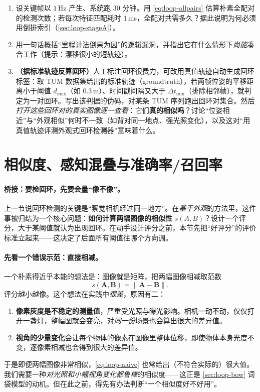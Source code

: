\begin{practice}
\begin{enumerate}
  \item 设关键帧以 $1$\,Hz 产生、系统跑 $30$ 分钟。用 \cref{eq:loop-allpairs} 估算朴素全配对的检测次数；若每次特征匹配耗时 $1$\,ms，全配对共需多久？据此说明为何必须用倒排索引（\cref{sec:loop-stageA}）。
  \item 用一句话概括“里程计法倒果为因”的逻辑漏洞，并指出它在什么情形下\emph{尚能}凑合工作（提示：漂移很小的短轨迹）。
  \item \textbf{（据标准轨迹反算回环）}人工标注回环很费力，可改用真值轨迹自动生成回环标签：取 TUM 数据集给出的标准轨迹（groundtruth），若两帧位姿的平移距离小于阈值 $d_{\max}$（如 $0.3$\,m）、时间戳间隔又大于 $\Delta t_{\min}$（排除相邻帧），就判定为一对回环。写出该判据的伪码，对某条 TUM 序列跑出回环对集合。然后\emph{打开这些回环对的真实图像逐一查看}：它们\textbf{真的相似吗}？讨论“位姿相近”与“外观相似”何时不一致（如背对同一地点、强光照变化），以及这对“用真值轨迹评测外观式回环检测器”意味着什么。
\end{enumerate}
\end{practice}

\section{相似度、感知混叠与准确率/召回率}
\label{sec:loop-pr}

\paragraph{桥接：要检回环，先要会量“像不像”。}
上一节说回环检测的关键是“察觉相机经过同一地方”。在\emph{基于外观}的方法里，这件事被归结为一个核心问题\cite{gaoxiang2019slam14}：\textbf{如何计算两幅图像的相似性} $s(A,B)$？设计一个评分，大于某阈值就认为出现回环。在动手设计评分之前，本节先把“好评分”的评价标准立起来——这决定了后面所有阈值往哪个方向调。

\paragraph{先看一个错误示范：直接相减。}
一个朴素得近乎本能的想法是：图像就是矩阵，把两幅图像相减取范数
\begin{equation}
  s(\mathbf A,\mathbf B)=\lVert\mathbf A-\mathbf B\rVert.
  \label{eq:loop-naive}
\end{equation}
评分越小越像。这个想法在实践中\emph{很差}，原因有二\cite{gaoxiang2019slam14}：
\begin{enumerate}
  \item \textbf{像素灰度是不稳定的测量值}，严重受光照与曝光影响。相机一动不动，仅仅打开一盏灯，整幅图就会变亮，对\emph{同一份}场景也会算出很大的差异值。
  \item \textbf{视角的少量变化}会让每个物体的像素在图像里整体位移，即使物体本身光度不变，逐像素相减也会得到很大的差异值。
\end{enumerate}
于是即便两幅图像非常相似，\cref{eq:loop-naive} 也常给出（不符合实际的）很大值。我们需要一种\emph{对光照和小幅视角变化都鲁棒}的相似度——这正是 \cref{sec:loop-bow} 词袋模型的动机。但在此之前，得先有办法判断“一个相似度好不好用”。

